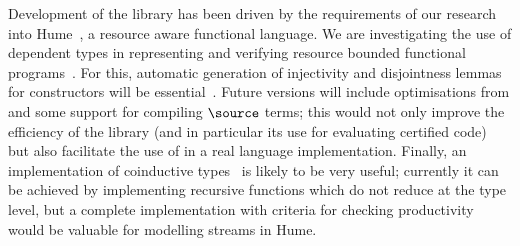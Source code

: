 
Development of the library has been driven by the requirements of
our research into Hume~\cite{Hume-GPCE}, a resource aware functional
language. We are investigating the use of dependent types in
representing and verifying resource bounded functional
programs~\cite{dt-framework}. 
For this, automatic generation of
injectivity and disjointness lemmas for constructors will be
essential~\cite{concon}.
Future versions will include
optimisations from \cite{brady-thesis} and some support for compiling
$\source$ terms; this would not only improve the efficiency of the
library (and in particular its use for evaluating certified code)
but also facilitate the use of \Ivor{} in a real language
implementation. Finally, an implementation of coinductive
types~\cite{coinductive} is likely to be very useful; currently it can
be achieved by implementing recursive functions which do not reduce at
the type level, but a complete implementation with criteria for
checking productivity would be valuable for modelling streams in Hume.
